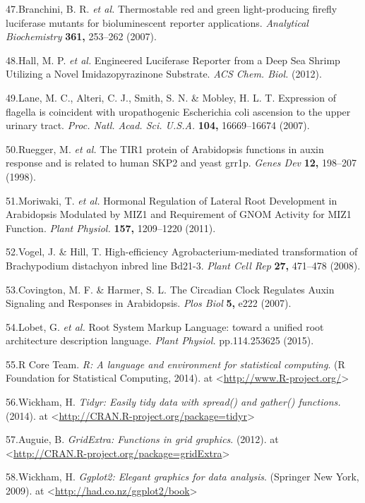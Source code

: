 \documentclass[]{article}
\begin{document}
47.Branchini, B. R. \emph{et al.} Thermostable red and green
light-producing firefly luciferase mutants for bioluminescent reporter
applications. \emph{Analytical Biochemistry} \textbf{361,} 253--262
(2007).

48.Hall, M. P. \emph{et al.} Engineered Luciferase Reporter from a Deep
Sea Shrimp Utilizing a Novel Imidazopyrazinone Substrate. \emph{ACS
Chem. Biol.} (2012).

49.Lane, M. C., Alteri, C. J., Smith, S. N. \& Mobley, H. L. T.
Expression of flagella is coincident with uropathogenic Escherichia coli
ascension to the upper urinary tract. \emph{Proc. Natl. Acad. Sci.
U.S.A.} \textbf{104,} 16669--16674 (2007).

50.Ruegger, M. \emph{et al.} The TIR1 protein of Arabidopsis functions
in auxin response and is related to human SKP2 and yeast grr1p.
\emph{Genes Dev} \textbf{12,} 198--207 (1998).

51.Moriwaki, T. \emph{et al.} Hormonal Regulation of Lateral Root
Development in Arabidopsis Modulated by MIZ1 and Requirement of GNOM
Activity for MIZ1 Function. \emph{Plant Physiol.} \textbf{157,}
1209--1220 (2011).

52.Vogel, J. \& Hill, T. High-efficiency Agrobacterium-mediated
transformation of Brachypodium distachyon inbred line Bd21-3.
\emph{Plant Cell Rep} \textbf{27,} 471--478 (2008).

53.Covington, M. F. \& Harmer, S. L. The Circadian Clock Regulates Auxin
Signaling and Responses in Arabidopsis. \emph{Plos Biol} \textbf{5,}
e222 (2007).

54.Lobet, G. \emph{et al.} Root System Markup Language: toward a unified
root architecture description language. \emph{Plant Physiol.}
pp.114.253625 (2015).

55.R Core Team. \emph{R: A language and environment for statistical
computing}. (R Foundation for Statistical Computing, 2014). at
\textless{}\url{http://www.R-project.org/}\textgreater{}

56.Wickham, H. \emph{Tidyr: Easily tidy data with spread() and gather()
functions.} (2014). at
\textless{}\url{http://CRAN.R-project.org/package=tidyr}\textgreater{}

57.Auguie, B. \emph{GridExtra: Functions in grid graphics}. (2012). at
\textless{}\url{http://CRAN.R-project.org/package=gridExtra}\textgreater{}

58.Wickham, H. \emph{Ggplot2: Elegant graphics for data analysis}.
(Springer New York, 2009). at
\textless{}\url{http://had.co.nz/ggplot2/book}\textgreater{}
\end{document}
